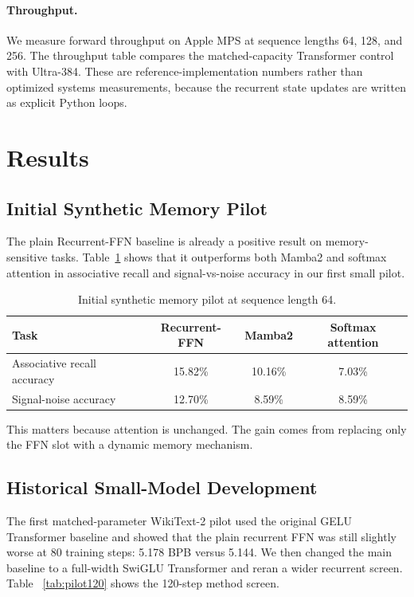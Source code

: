 \documentclass[11pt]{article}
\begin{document}
\paragraph{Throughput.}
We measure forward throughput on Apple MPS at sequence lengths 64, 128, and
256. The throughput table compares the matched-capacity Transformer control
with Ultra-384. These are reference-implementation numbers rather than
optimized systems measurements, because the recurrent state updates are written
as explicit Python loops.

\section{Results}
\subsection{Initial Synthetic Memory Pilot}
The plain Recurrent-FFN baseline is already a positive result on memory-
sensitive tasks. Table~\ref{tab:memory} shows that it outperforms both Mamba2
and softmax attention in associative recall and signal-vs-noise accuracy in
our first small pilot.

\begin{table}[t]
  \centering
  \caption{Initial synthetic memory pilot at sequence length 64.}
  \label{tab:memory}
  \begin{tabular}{lccc}
    \toprule
    Task & Recurrent-FFN & Mamba2 & Softmax attention \\
    \midrule
    Associative recall accuracy & 15.82\% & 10.16\% & 7.03\% \\
    Signal-noise accuracy & 12.70\% & 8.59\% & 8.59\% \\
    \bottomrule
  \end{tabular}
\end{table}

This matters because attention is unchanged. The gain comes from replacing only
the FFN slot with a dynamic memory mechanism.

\subsection{Historical Small-Model Development}
The first matched-parameter WikiText-2 pilot used the original GELU Transformer
baseline and showed that the plain recurrent FFN was still slightly worse at 80
training steps: 5.178 BPB versus 5.144. We then changed the main baseline to a
full-width SwiGLU Transformer and reran a wider recurrent screen. Table
~\ref{tab:pilot120} shows the 120-step method screen.
\end{document}
